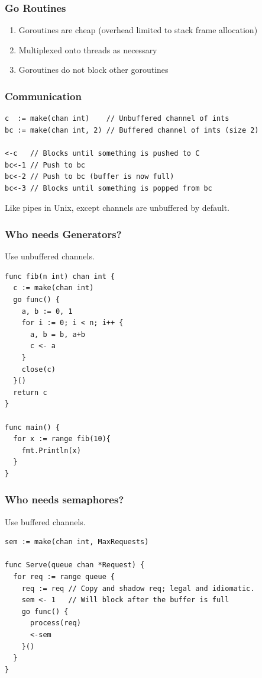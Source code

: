 \documentclass[xelatex,aspectratio=169]{beamer}
\begin{document}
\begin{frame}
	\frametitle{Go Routines}
	\begin{enumerate}
		\item<1> Goroutines are cheap (overhead limited to stack frame allocation)
		\item<2> Multiplexed onto threads as necessary
		\item<3> Goroutines do not block other goroutines
	\end{enumerate}
\end{frame}

\begin{frame}[fragile]
	\frametitle{Communication}
\begin{verbatim}
c  := make(chan int)    // Unbuffered channel of ints
bc := make(chan int, 2) // Buffered channel of ints (size 2)

<-c   // Blocks until something is pushed to C
bc<-1 // Push to bc
bc<-2 // Push to bc (buffer is now full)
bc<-3 // Blocks until something is popped from bc
\end{verbatim}
\begin{flushleft}
	Like pipes in Unix, except channels are unbuffered by default.
\end{flushleft}
\end{frame}

\begin{frame}[fragile]
	\frametitle{Who needs Generators?}
	Use unbuffered channels.
\tiny
\begin{verbatim}
func fib(n int) chan int {
  c := make(chan int)
  go func() {
    a, b := 0, 1
    for i := 0; i < n; i++ {
      a, b = b, a+b
      c <- a
    }
    close(c)
  }()
  return c
}

func main() {
  for x := range fib(10){
    fmt.Println(x)
  }
}
\end{verbatim}
\end{frame}

\begin{frame}[fragile]
	\frametitle{Who needs semaphores?}
	Use buffered channels.
\tiny
\begin{verbatim}
sem := make(chan int, MaxRequests)

func Serve(queue chan *Request) {
  for req := range queue {
    req := req // Copy and shadow req; legal and idiomatic.
    sem <- 1   // Will block after the buffer is full
    go func() {
      process(req)
      <-sem
    }()
  }
}
\end{verbatim}
\end{frame}
\end{document}
